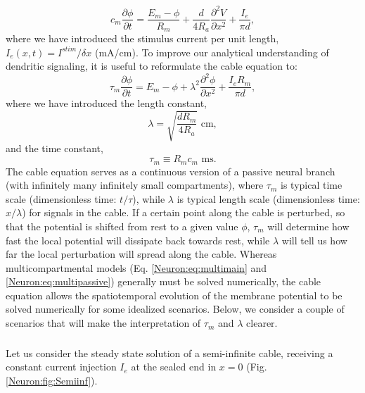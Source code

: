 \begin{equation}
c_m \frac{\partial \phi}{\partial t} = \frac{E_m-\phi}{R_m} +  \frac{d}{4 R_a}  \frac{\partial^2 V}{\partial x^2}  + \frac{I_e}{\pi d},
\label{Neuron:eq:cable}
\end{equation}
where we have introduced the stimulus current per unit length, $I_e(x,t) = I^{stim}/\delta x$ (mA/cm). To improve our analytical understanding of dendritic signaling, it is useful to reformulate the cable equation to:
\begin{equation}
\tau_m \frac{\partial \phi}{\partial t} = E_m-\phi +   \lambda^2  \frac{\partial^2 \phi}{\partial x^2}  + \frac{I_e R_m}{\pi d},
\label{Neuron:eq:cable2}
\end{equation}
where we have introduced the length constant,
\begin{equation}
\lambda = \sqrt{\frac{d R_m}{4 R_a}} \,\, \text{cm}, 
\label{Neuron:eq:lengthconst}
\end{equation}
and the time constant, 
\begin{equation}
\tau_m \equiv R_m c_m  \,\, \text{ms}.
\label{Neuron:eq:timeconst}
\end{equation}
The cable equation serves as a continuous version of a passive neural branch (with infinitely many infinitely small compartments), 
where $\tau_m$ is typical time scale (dimensionless time: $t/\tau$), while $\lambda$  is typical length scale  (dimensionless time: $x/\lambda$) for signals in the cable. If a certain point along the cable is perturbed, so that the potential is shifted from rest to a given value $\phi$, $\tau_m$ will determine how fast the local potential will dissipate back towards rest, while $\lambda$ will tell us how far the local perturbation will spread along the cable. Whereas multicompartmental models (Eq. \ref{Neuron:eq:multimain} and \ref{Neuron:eq:multipassive}) generally must be solved numerically, the cable equation allows the spatiotemporal evolution of the membrane potential to be solved numerically for some idealized scenarios. Below, we consider a couple of scenarios that will  make the interpretation of $\tau_m$ and $\lambda$ clearer. 


\subsubsection{}
\label{sec:Neuron:cableSS}
Let us consider the steady state solution of a semi-infinite cable, receiving a constant current injection $I_e$ at the sealed end in $x=0$ (Fig. \ref{Neuron:fig:Semiinf}).

